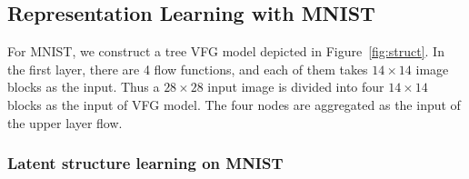 \documentclass[twoside]{article}
\begin{document}
\subsection{Representation Learning with MNIST}
For MNIST, we construct a tree  VFG model depicted in Figure~\ref{fig:struct}.  
In the first layer, there are 4 flow functions, and each of them takes $14\times 14$ image blocks as the input. 
Thus a $28\times 28$ input image is divided into four $14\times 14$ blocks as the input of VFG model. 
The four nodes are aggregated as the input of the upper layer flow. 


 
 
\subsubsection{Latent structure learning on MNIST}
\end{document}
